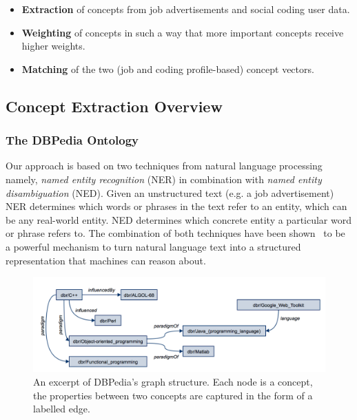 \documentclass[conference]{IEEEtran}
\begin{document}
\begin{itemize}

  \item \textbf{Extraction} of concepts from job advertisements and social
    coding user data.

  \item \textbf{Weighting} of concepts in such a way that more important
    concepts receive higher weights.

  \item \textbf{Matching} of the two (job and coding profile-based) concept
    vectors.

\end{itemize}

\subsection{Concept Extraction Overview}


\subsubsection{The DBPedia Ontology}
Our approach is based on two techniques from natural language processing namely,
\emph{named entity recognition} (NER) in combination with \emph{named entity
disambiguation} (NED). Given an unstructured text (e.g. a job advertisement) NER determines which words or phrases in the text refer to an
entity, which can be any real-world entity. NED
determines which concrete entity a particular word or phrase refers to.  The
combination of both techniques have been shown~\cite{aggarwal2012mining} to be a
powerful mechanism to turn natural language text into a structured representation
that machines can reason about.

\begin{figure}[!htb]
\centering
\includegraphics[scale=0.4]{../figs/dbpedia-example-graph.png}
\caption{An excerpt of DBPedia's graph structure. Each node is a concept, the properties between two concepts are captured in the form of a labelled edge.}
\label{fig:dbpedia-example}
\end{figure}
\end{document}
